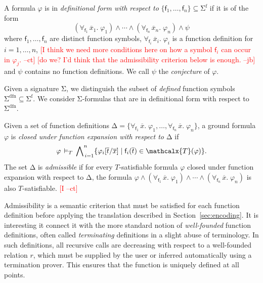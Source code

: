 \documentclass[runningheads,a4paper]{llncs}
\renewcommand\models{\mathrel{\vDash}}
\newcommand\DDD{\Delta}
\newcommand{\con}[1]{\mathsf{#1}}
\renewcommand\vec[1]{\overline{#1}}
\let\oldSigma=\Sigma
\def\Sigma{\mathrm{\oldSigma}}
\let\oldDelta=\Delta
\def\Delta{\mathrm{\oldDelta}}
\let\oldwedge=\wedge
\def\wedge{\mathrel{\oldwedge}}
\newcommand{\terms}{\mathcalx{T}}
\newcommand{\sfuns}[1]{#1^\mathrm{f}}
\newcommand{\sfundefs}[1]{#1^\mathrm{dfn}}
\newcommand{\forallf}[1]{\forall_{\!#1\:}}
\newcommand{\rem}[1]{\textcolor{red}{[#1]}}
\newcommand{\jb}[1]{\rem{#1 --jb}}
\newcommand{\ct}[1]{\rem{#1 --ct}}
\begin{document}
\begin{definition}\rm
A formula $\varphi$ is in \emph{definitional form with respect to}
$\{ \con{f}_1, \ldots, \con{f}_n \} \subseteq \sfuns{\Sigma}$ if it is of the
form
%
%
\[(\forallf{\con{f}_1} \vec x_1.\; \varphi_1) \wedge \cdots \wedge
(\forallf{\con{f}_n} \vec x_n.\; \varphi_n) \wedge \psi\]
%
where $\con{f}_1, \ldots, \con{f}_n$ are distinct function symbols,
$\forallf{\con{f}_i} \vec x_i.\; \varphi_i$ is a function definition
for $i = 1, \ldots, n$,
%
\ct{I think we need more conditions here on how a symbol $\con{f}_i$ can occur in $\varphi_j$.}
\jb{do we? I'd think that the admissibility criterion below is enough.}
and $\psi$ contains no function definitions.
We call $\psi$ the \emph{conjecture} of $\varphi$.
\end{definition}

Given a signature $\Sigma$, we distinguish the subset of \emph{defined}
function symbols $\sfundefs{\Sigma} \subseteq \sfuns{\Sigma}$.
We consider $\Sigma$-formulas that are in definitional form with respect to
$\sfundefs{\Sigma}$.

\begin{definition}\rm
Given a set of function definitions 
$\DDD = \{ \forallf{\con{f}_1} \vec x.\; \varphi_1, \ldots, \forallf{\con{f}_n} \vec x.\; \varphi_n \}$, 
a ground formula $\varphi$ 
is \emph{closed under function expansion with respect to $\DDD$} if 
\[
 \varphi \,\models_T\, \bigwedge\nolimits_{\,i=1}^{n} \{ \varphi_i[ \vec t / \vec x ] \mid \con{f}_i( \vec t ) \in \terms( \varphi ) \} .
\]
The set $\DDD$ is \emph{admissible} if for every $T$-satisfiable formula 
$\varphi$ closed under function expansion with respect to $\DDD$,
the formula
$\varphi \wedge (\forallf{\con{f}_1} \vec x.\; \varphi_1) \wedge \cdots \wedge (\forallf{\con{f}_n} \vec x.\; \varphi_n)$ is also $T$-satisfiable.
\ct{I}
\end{definition}

Admissibility is a semantic criterion that must be satisfied for each function
definition before applying the translation described in
Section~\ref{sec:encoding}. It is interesting it connect it with the more
standard notion of \emph{well-founded} function definitions, often called
\emph{terminating} definitions in a slight abuse of terminology. In such
definitions, all recursive calls are decreasing with respect to a well-founded
relation $r$, which must be supplied by the user or inferred automatically
using a termination prover. This ensures that the function is uniquely defined
at all points.
\end{document}
